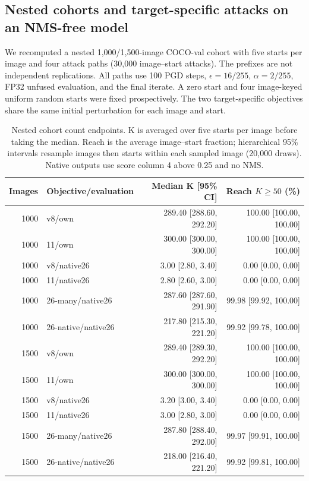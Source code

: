 \subsection{Nested cohorts and target-specific attacks on an NMS-free model}
\label{sec:nested1500}
We recomputed a nested 1,000/1,500-image COCO-val cohort with five starts per image and four attack paths (30,000 image--start attacks). The prefixes are not independent replications. All paths use 100 PGD steps, $\epsilon=16/255$, $\alpha=2/255$, FP32 unfused evaluation, and the final iterate. A zero start and four image-keyed uniform random starts were fixed prospectively. The two target-specific objectives share the same initial perturbation for each image and start.
\begin{table}[t]\centering\small
\caption{Nested cohort count endpoints. K is averaged over five starts per image before taking the median. Reach is the average image--start fraction; hierarchical 95\% intervals resample images then starts within each sampled image (20,000 draws). Native outputs use score column 4 above 0.25 and no NMS.}
\label{tab:nested1500}\begin{tabular}{rlrr}\hline
Images & Objective/evaluation & Median K [95\% CI] & Reach $K\geq50$ (\%)\\\hline
1000 & v8/own & 289.40 [288.60, 292.20] & 100.00 [100.00, 100.00]\\
1000 & 11/own & 300.00 [300.00, 300.00] & 100.00 [100.00, 100.00]\\
1000 & v8/native26 & 3.00 [2.80, 3.40] & 0.00 [0.00, 0.00]\\
1000 & 11/native26 & 2.80 [2.60, 3.00] & 0.00 [0.00, 0.00]\\
1000 & 26-many/native26 & 287.60 [287.60, 291.90] & 99.98 [99.92, 100.00]\\
1000 & 26-native/native26 & 217.80 [215.30, 221.20] & 99.92 [99.78, 100.00]\\
1500 & v8/own & 289.40 [289.30, 292.20] & 100.00 [100.00, 100.00]\\
1500 & 11/own & 300.00 [300.00, 300.00] & 100.00 [100.00, 100.00]\\
1500 & v8/native26 & 3.20 [3.00, 3.40] & 0.00 [0.00, 0.00]\\
1500 & 11/native26 & 3.00 [2.80, 3.00] & 0.00 [0.00, 0.00]\\
1500 & 26-many/native26 & 287.80 [288.40, 292.00] & 99.97 [99.91, 100.00]\\
1500 & 26-native/native26 & 218.00 [216.40, 221.20] & 99.92 [99.81, 100.00]\\
\hline\end{tabular}\end{table}
